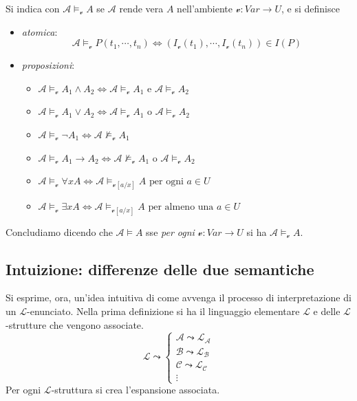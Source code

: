 \begin{defi}
Si indica con $\mathscr{A}\models_{\mathcal{v}} A$ se $\mathscr{A}$ rende vera $A$ nell'ambiente $\mathcal{v}: Var \rightarrow U$, e si definisce
\begin{itemize}
  \item \textit{atomica}:
  $$
  \mathscr{A} \models_{\mathcal{v}} P(t_1, \cdots, t_n) \iff (I_{\mathcal{v}}(t_1), \cdots, I_{\mathcal{v}}(t_n)) \in I(P)
  $$
  \item \textit{proposizioni}:
    \begin{itemize}
      \item  $\mathscr{A} \models_{\mathcal{v}} A_1 \land A_2 \iff \mathscr{A} \models_{\mathcal{v}} A_1$ e $\mathscr{A} \models_{\mathcal{v}} A_2$
      \item $\mathscr{A} \models_{\mathcal{v}}A_1 \lor A_2 \iff \mathscr{A} \models_{\mathcal{v}} A_1$ o $\mathscr{A} \models_{\mathcal{v}} A_2$
      \item $\mathscr{A} \models_{\mathcal{v}}  \neg A_1  \iff \mathscr{A} \nvDash_{\mathcal{v}} A_1 $
      \item $\mathscr{A} \models_{\mathcal{v}} A_1 \rightarrow A_2 \iff \mathscr{A} \nvDash_{\mathcal{v}} A_1$ o $\mathscr{A} \models_{\mathcal{v}} A_2$
      \item $\mathscr{A} \models_{\mathcal{v}} \forall x A \iff \mathscr{A} \models_{\mathcal{v}[a/x]} A \text{ per ogni } a \in U$
      \item $\mathscr{A} \models_{\mathcal{v}} \exists x A \iff \mathscr{A} \models_{\mathcal{v}[a/x]} A \text{ per almeno una  } a \in U$
    \end{itemize}
\end{itemize}
Concludiamo dicendo che $\mathscr{A} \models A$ sse \textit{per ogni}  $\mathcal{v}: Var \rightarrow U$ si ha $\mathscr{A} \models_\mathcal{v} A$.
\end{defi}

\subsection{Intuizione: differenze delle due semantiche}
Si esprime, ora, un'idea intuitiva di come avvenga il processo di interpretazione 
di un $\mathscr{L}$-enunciato. Nella prima definizione si ha il linguaggio elementare $\mathscr{L}$ e delle 
$\mathscr{L}$-strutture che vengono associate. 
$$
\mathscr{L} \leadsto
\begin{cases}
        \mathscr{A}  \leadsto \mathscr{L}_{\mathscr{A}} \\
        \mathscr{B}  \leadsto \mathscr{L}_{\mathscr{B}} \\
        \mathscr{C}  \leadsto \mathscr{L}_{\mathscr{C}} \\
        \vdots 
\end{cases}
$$
Per ogni $\mathscr{L}$-struttura si crea l'espansione associata. 

